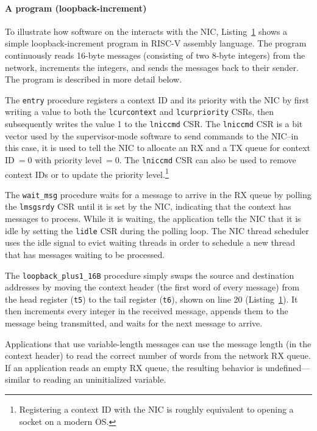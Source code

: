 \begin{figure}
  \centering
  \small
  \begin{minipage}[c]{0.9\linewidth}
  
  \end{minipage}
  \vspace{-10pt}
  \label{lst:asm}
\end{figure}

\paragraph{A \name{} program (loopback-increment)}
To illustrate how software on the \name{} interacts with the NIC, Listing~\ref{lst:asm} shows a simple loopback-increment program in RISC-V assembly language.
The program continuously reads 16-byte messages (consisting of two 8-byte integers) from the network, increments the integers, and sends the messages back to their sender.
The program is described in more detail below.

The \verb|entry| procedure registers a context ID and its priority with the NIC by first writing a value to both the \verb|lcurcontext| and \verb|lcurpriority| CSRs, then subsequently writes the value 1 to the \verb|lniccmd| CSR.
The \verb|lniccmd| CSR is a bit vector used by the supervisor-mode software  to send commands to the NIC--in this case, it is used to tell the NIC to allocate an RX and a TX queue for context ID$~=0$ with priority level$~=0$.
The \verb|lniccmd| CSR can also be used to remove context IDs or to update the priority level.\footnote{Registering a context ID with the NIC is roughly equivalent to opening a socket on a modern OS.}

The \verb|wait_msg| procedure waits for a message to arrive in the RX queue by polling the \verb|lmsgsrdy| CSR until it is set by the NIC, indicating that the context has messages to process.
While it is waiting, the application tells the NIC that it is idle by setting the \verb|lidle| CSR during the polling loop.
The NIC thread scheduler uses the idle signal to evict waiting threads in order to schedule a new thread that has messages waiting to be processed.

The \verb|loopback_plus1_16B| procedure simply swaps the source and destination addresses by moving the context header (the first word of every message) from the head register (\verb|t5|) to the tail register (\verb|t6|), shown on line 20 (Listing~\ref{lst:asm}). 
It then increments every integer in the received message, appends them to the message being transmitted, and waits for the next message to arrive.

Applications that use variable-length messages can use the message length (in the context header) to read the correct number of words from the network RX queue.
If an application reads an empty RX queue, the resulting behavior is undefined---similar to reading an uninitialized variable.
